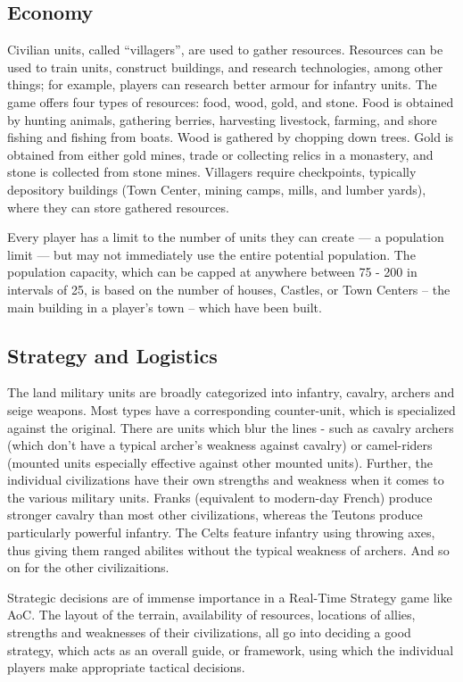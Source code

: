 \documentclass[a4paper,12pt]{article}
\begin{document}
\subsection*{Economy}
Civilian units, called ``villagers'', are used to gather resources. Resources can be used to train units, 
construct buildings, and research technologies, among other things; for example, players can research 
better armour for infantry units. The game offers four types of resources: food, wood, gold, and stone. 
Food is obtained by hunting animals, gathering berries, harvesting livestock, farming, and shore fishing 
and fishing from boats. Wood is gathered by chopping down trees. Gold is obtained from either gold 
mines, trade or collecting relics in a monastery, and stone is collected from stone mines. Villagers 
require checkpoints, typically depository buildings (Town Center, mining camps, mills, and lumber yards), 
where they can store gathered resources.

Every player has a limit to the number of units they can create — a population limit — but may not 
immediately use the entire potential population. The population capacity, which can be capped at 
anywhere between 75 - 200 in intervals of 25, is based on the number of houses, Castles, or Town Centers
-- the main building in a player's town -- which have been built.

\subsection*{Strategy and Logistics}
The land military units are broadly categorized into infantry, cavalry, archers and seige weapons.
Most types have a corresponding counter-unit, which is specialized against the original. There are
units which blur the lines - such as cavalry archers (which don't have a typical archer's weakness 
against cavalry) or camel-riders (mounted units especially effective against other mounted units).
Further, the individual civilizations have their own strengths and weakness when it comes to the
various military units. Franks (equivalent to modern-day French) produce stronger cavalry than most other
civilizations, whereas the Teutons produce particularly powerful infantry. The Celts feature infantry 
using throwing axes, thus giving them ranged abilites without the typical weakness of archers. And so
on for the other civilizaitions.

Strategic decisions are of immense importance in a Real-Time Strategy game like AoC. The layout of the
terrain, availability of resources, locations of allies, strengths and weaknesses of their civilizations,
all go into deciding a good strategy, which acts as an overall guide, or framework,  using which the 
individual players make appropriate tactical decisions.
\end{document}
